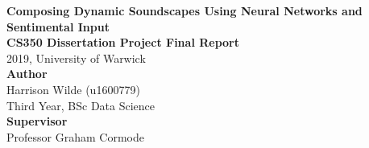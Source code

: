 \documentclass[12pt,]{article}
\title{}
\author{}
\date{}
\begin{document}

\null\vspace{\fill}
\begin{center}
\Huge{\textbf{Composing Dynamic Soundscapes Using Neural Networks and Sentimental Input}}\\
\vspace*{2\baselineskip}
\Large{\textbf{CS350 Dissertation Project Final Report}}\\
2019, University of Warwick\\
\vspace*{2\baselineskip}
\Large{\textbf{Author}}\\
Harrison Wilde (u1600779)\\
Third Year, BSc Data Science\\
\vspace*{2\baselineskip}
\Large{\textbf{Supervisor}}\\
Professor Graham Cormode\\
\vspace*{3\baselineskip}
\end{center}
\vspace{\fill}

\onehalfspacing

\hypersetup{linkcolor = black}
\newpage
{}
\tableofcontents
\newpage
\setcounter{page}{3}
\listoffigures 
\newpage

\listoftables
\newpage
\hypersetup{linkcolor = red}


\end{document}
